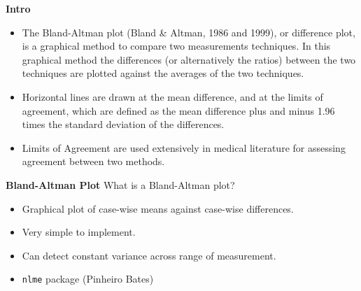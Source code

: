\documentclass[compress]{beamer}        %
\makeatletter
\newcommand{\tcb}{\textcolor{beamer@blendedblue}}
\makeatother
\begin{document}
\begin{frame}{\bf \tcb{Intro}}
\begin{itemize}\itemsep0.7cm

\item The Bland-Altman plot (Bland \& Altman, 1986 and 1999), or difference plot, is a graphical method to compare two measurements techniques. In this graphical method the differences (or alternatively the ratios) between the two techniques are plotted against the averages of the two techniques.

\item Horizontal lines are drawn at the mean difference, and at the limits of agreement, which are defined as the mean difference plus and minus 1.96 times the standard deviation of the differences.

\item Limits of Agreement are used extensively in medical literature for assessing agreement between two methods.
\end{itemize}
\end{frame}
\begin{frame}{\bf \tcb{Bland-Altman Plot}}
What is a Bland-Altman plot?
\begin{itemize}
\item Graphical plot of case-wise means against case-wise differences.
\item Very simple to implement.
\item Can detect constant variance across range of measurement.
\item \texttt{nlme} package (Pinheiro Bates)
\end{itemize}
\end{frame}


\end{document}
